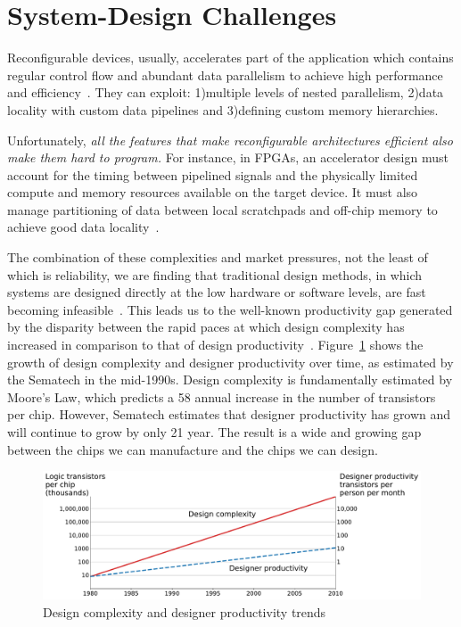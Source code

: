 \section{System-Design Challenges}


Reconfigurable devices, usually, accelerates part of the application which contains regular control flow and abundant data parallelism to achieve high performance and efficiency~\cite{spatial_computation, trips, govindaraju_hpca_2011}.
They can exploit: 1)multiple levels of nested parallelism, 2)data locality with custom data pipelines and 3)defining custom memory hierarchies.

Unfortunately, \textit{all the features that make reconfigurable architectures efficient also make them hard to program.}
For instance, in FPGAs, an accelerator design must account for the timing between pipelined signals and the physically limited compute and memory resources available on the target device.
It must also manage partitioning of data between local scratchpads and off-chip memory to achieve good data locality~\cite{gzip_2013_fpga}.


The combination of these complexities and market pressures, not the least
of which is reliability, we are finding that traditional design methods, in which
systems are designed directly at the low hardware or software levels, are fast
becoming infeasible~\cite{cascaval_taxonomy_accelerator}. This leads us to the well-known productivity gap generated by the disparity between the rapid paces at which design complexity has increased in comparison to that of design productivity~\cite{itrs}.
Figure~\ref{fig:productivity} shows the growth of design complexity and designer productivity
over time, as estimated by the Sematech in the mid-1990s. Design complexity
is fundamentally estimated by Moore’s Law, which predicts a 58%
annual increase in the number of transistors per chip. However, Sematech estimates that
designer productivity has grown and will continue to grow by only 21%
year. The result is a wide and growing gap between the chips we can manufacture
and the chips we can design. 

\begin{figure}[h]
    \centering
    \includegraphics[width=\textwidth]{plots/productivity.pdf}
    \caption{Design complexity and designer productivity trends}
    \label{fig:productivity}
\end{figure}


